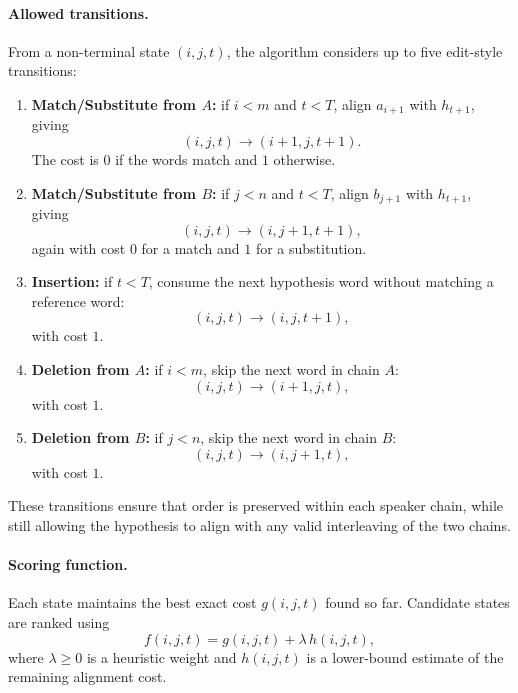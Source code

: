 \paragraph{Allowed transitions.}
From a non-terminal state \((i,j,t)\), the algorithm considers up to five edit-style transitions:
\begin{enumerate}
    \item \textbf{Match/Substitute from \(A\):}
    if \(i<m\) and \(t<T\), align \(a_{i+1}\) with \(h_{t+1}\), giving
    \begin{equation}
    (i,j,t) \rightarrow (i+1,j,t+1).
    \end{equation}
    The cost is \(0\) if the words match and \(1\) otherwise.

    \item \textbf{Match/Substitute from \(B\):}
    if \(j<n\) and \(t<T\), align \(b_{j+1}\) with \(h_{t+1}\), giving
    \begin{equation}
    (i,j,t) \rightarrow (i,j+1,t+1),
    \end{equation}
    again with cost \(0\) for a match and \(1\) for a substitution.

    \item \textbf{Insertion:}
    if \(t<T\), consume the next hypothesis word without matching a reference word:
    \begin{equation}
    (i,j,t) \rightarrow (i,j,t+1),
    \end{equation}
    with cost \(1\).

    \item \textbf{Deletion from \(A\):}
    if \(i<m\), skip the next word in chain \(A\):
    \begin{equation}
    (i,j,t) \rightarrow (i+1,j,t),
    \end{equation}
    with cost \(1\).

    \item \textbf{Deletion from \(B\):}
    if \(j<n\), skip the next word in chain \(B\):
    \begin{equation}
    (i,j,t) \rightarrow (i,j+1,t),
    \end{equation}
    with cost \(1\).
\end{enumerate}

These transitions ensure that order is preserved within each speaker chain, while still allowing the hypothesis to align with any valid interleaving of the two chains.

\paragraph{Scoring function.}
Each state maintains the best exact cost \(g(i,j,t)\) found so far. Candidate states are ranked using
\begin{equation}
f(i,j,t) = g(i,j,t) + \lambda\, h(i,j,t),
\end{equation}
where \(\lambda \ge 0\) is a heuristic weight and \(h(i,j,t)\) is a lower-bound estimate of the remaining alignment cost.

